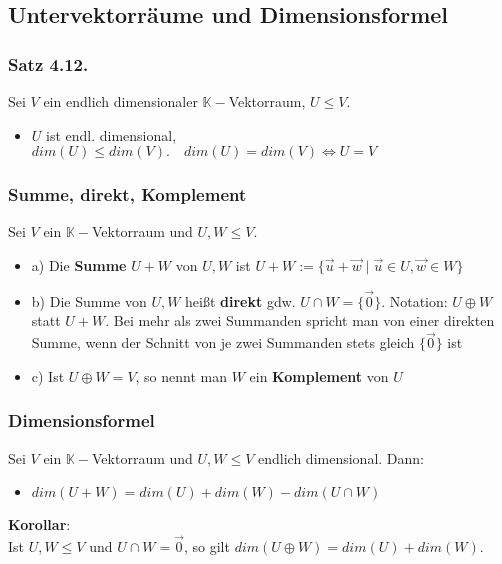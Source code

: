 \documentclass[titlepage]{article}
\newcommand{\K}{\mathbb{K}}
\newcommand{\1}{\mathbb{1}}
\newcommand{\0}{\mathbb{0}}
\begin{document}
			\subsection{Untervektorräume und Dimensionsformel}
				\subsubsection{Satz 4.12.}
					Sei $V$ ein endlich dimensionaler $\K-$Vektorraum, $U\le V$.
					\begin{itemize}
						\item $U$ ist endl. dimensional, $dim(U)\le dim(V).\quad dim(U)=dim(V)\Longleftrightarrow U=V$
					\end{itemize}
				\subsubsection{Summe, direkt, Komplement}
					Sei $V$ ein $\K-$Vektorraum und $U,W\le V$.
					\begin{itemize}
						\item a) Die \textbf{Summe} $U+W$ von $U,W$ ist $U+W:=\{\vec{u}+\vec{w}\mid\vec{u}\in U,\vec{w}\in W\}$
						\item b) Die Summe von $U,W$ heißt \textbf{direkt} gdw. $U\cap W=\{\vec{0}\}$. Notation: $U\oplus W$ statt $U+W$. Bei mehr als zwei Summanden spricht man von einer direkten Summe, wenn der Schnitt von je zwei Summanden stets gleich $\{\vec{0}\}$ ist
						\item c) Ist $U\oplus W=V$, so nennt man $W$ ein \textbf{Komplement} von $U$
					\end{itemize}
				\subsubsection{Dimensionsformel}
					Sei $V$ ein $\K-$Vektorraum und $U,W\le V$ endlich dimensional. Dann:
					\begin{itemize}
						\item $dim(U+W)=dim(U)+dim(W)-dim(U\cap W)$
					\end{itemize}
					\textbf{Korollar}: \\
					Ist $U,W\le V$ und $U\cap W=\vec{0}$, so gilt $dim(U\oplus W)=dim(U)+dim(W)$.
\end{document}
